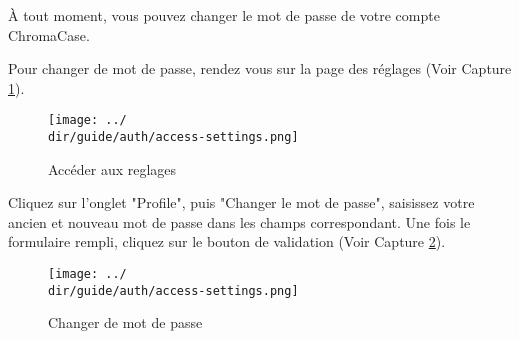 À tout moment, vous pouvez changer le mot de passe de votre compte ChromaCase.

Pour changer de mot de passe, rendez vous sur la page des réglages (Voir Capture \ref{fig:access-settings-password}).

\begin{figure}[H]
	\texttt{[image: ../\\dir/guide/auth/access-settings.png]}
	\caption{Accéder aux reglages}
	\label{fig:access-settings-password}
\end{figure}

Cliquez sur l'onglet "Profile", puis "Changer le mot de passe", saisissez votre ancien et nouveau mot de passe dans les champs correspondant. Une fois le formulaire rempli, cliquez sur le bouton de validation (Voir Capture \ref{fig:change-password}).

\begin{figure}[H]
	\texttt{[image: ../\\dir/guide/auth/access-settings.png]}
	\caption{Changer de mot de passe}
	\label{fig:change-password}
\end{figure}